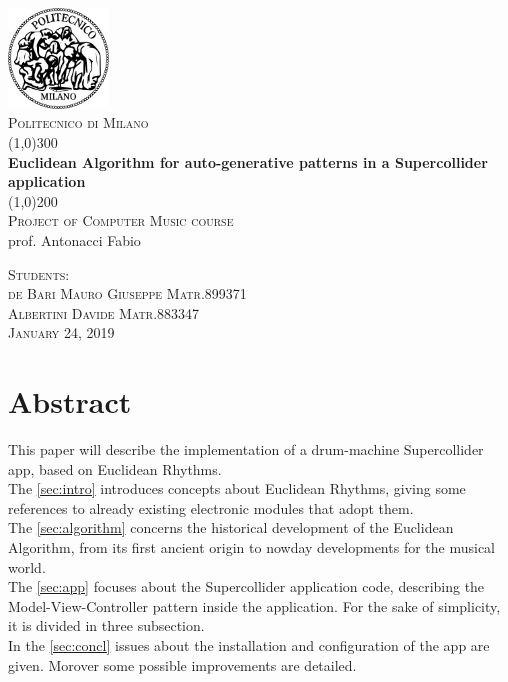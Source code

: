 \documentclass[a4paper, 12pt]{article}
\newcommand\blueref[1]{{\hypersetup{linkbordercolor=blue}\autoref{#1}}}
\begin{document}
\begin{titlepage}
	\begin{center}
	\includegraphics[width=0.2\textwidth]{images/logo.png}\\[0.3cm] 
	\textsc{\normalsize Politecnico di Milano}\\[4cm]
	\line(1,0){300}\\
	[0.25in]
	\huge{\bfseries Euclidean Algorithm for auto-generative patterns in a Supercollider application}\\
	[2mm]
	\line(1,0){200}\\
	[1cm]
	\textsc{\LARGE Project of Computer Music course}\\
	[0.1cm]
	{\large prof. Antonacci Fabio}\\
	[4cm]
	\end{center}
	\begin{flushright}
	\textsc{\large  Students:\\
	de Bari Mauro Giuseppe Matr.899371 \\
	Albertini Davide Matr.883347\\
	January 24, 2019 \\}
	\end{flushright}
\end{titlepage}

\section*{Abstract}
This paper will describe the implementation of a drum-machine Supercollider app, based on Euclidean Rhythms.\\
The \blueref{sec:intro} introduces concepts about Euclidean Rhythms, giving some references to already existing electronic modules that adopt them.\\
The \blueref{sec:algorithm} concerns the historical development of the Euclidean Algorithm, from its first ancient origin to nowday developments for the musical world.\\
The \blueref{sec:app} focuses about the Supercollider application code, describing the Model-View-Controller pattern inside the application. For the sake of simplicity, it is divided in three subsection.\\
In the \blueref{sec:concl} issues about the installation and configuration of the app are given. Morover some possible improvements are detailed.
\end{document}
